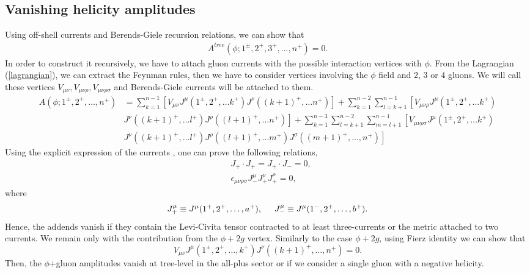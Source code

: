 \subsection{Vanishing helicity amplitudes}
Using off-shell currents and Berends-Giele recursion relations, we can show that \cite{Dixon_2004}
\begin{align*}
	A^{tree}(\phi;1^\pm,2^+,3^+,\dots, n^+)=0.		\label{vanamp}
\end{align*}
In order to construct it recursively, we have to attach gluon currents with the possible interaction vertices with $\phi$. From the Lagrangian (\ref{lagrangian}),  we can extract the Feynman rules, then we have to consider vertices involving the $\phi$ field and $2$, $3$ or $4$ gluons. We will call these vertices $V_{\mu\nu}, V_{\mu\nu\rho}, V_{\mu\nu\rho\sigma}$ and Berends-Giele currents will be attached to them.
\begin{align*}
	A(\phi;1^\pm,2^+,\dots,n^+)&=\sum_{k=1}^{n-1}  \left[V_{\mu\nu} J^\mu(1^\pm,2^+,\dots k^+) J^\nu((k+1)^+,\dots n^+)\right]+\sum_{k=1}^{n-2} \sum_{l=k+1}^{n-1} \left[V_{\mu\nu\rho} J^\mu(1^\pm,2^+,\dots k^+) \right.\\
	&\left.J^\nu((k+1)^+,\dots l^+) J^\rho((l+1)^+,\dots n^+)\right] +\sum_{k=1}^{n-3} \sum_{l=k+1}^{n-2} \sum_{m=l+1}^{n-1} \left[V_{\mu\nu\rho\sigma} J^\mu(1^\pm,2^+,\dots k^+) \right.\\ &\left.J^\nu((k+1)^+,\dots l^+) J^\rho((l+1)^+,\dots m^+) J^\sigma((m+1)^+,\dots, n^+)\right]
\end{align*}
Using the explicit expression of the currents \cite{Dixon:1996wi,Berends:1987me}, one can prove the following relations,
\begin{align*}
	&J_+ \cdot J_+= J_+ \cdot J_-=0,\\
	&\epsilon_{\mu\nu\rho\sigma} J^\mu_- J^\nu_+ J^\rho_+=0,
\end{align*}
where
$$
	J^\mu_{+}\equiv J^\mu(1^+,2^+,\dots, a^+), \hspace{0.5cm} J^\mu_-\equiv J^\mu(1^-,2^+,\dots, b^+).
$$
Hence, the addends vanish if they contain the Levi-Civita tensor contracted to at least three-currents or the metric attached to two currents. We remain only with the contribution from the $\phi+2g$ vertex. Similarly to the case $\phi+2g$, using Fierz identity we can show that
$$
	V_{\mu\nu} J^\mu(1^\pm, 2^+, \dots, k^+)J^\nu((k+1)^+,\dots, n^+)=0.
$$
Then, the $\phi$+gluon amplitudes vanish at tree-level in the all-plus sector or if we consider a single gluon with a negative helicity.
